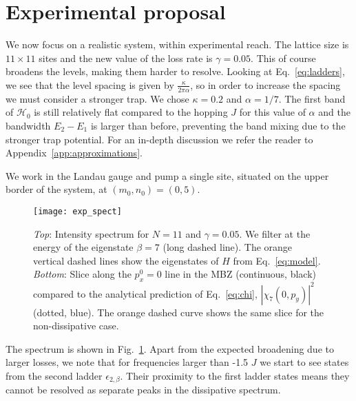 \documentclass[twocolumn, 10pt, aps, superscriptaddress, floatfix, showpacs, pra, citeautoscript]{revtex4-1}
\newcommand{\co}[2]{#2}
\renewcommand{\paragraph}{\co}
\begin{document}

\section{Experimental proposal}
\label{sec:experiment}

\paragraph{Greater dissipation implies spectral broadening.}
We now focus on a realistic system, within experimental reach. The
lattice size is $11 \times 11$ sites and the new value of the loss
rate is $\gamma = 0.05$. This of course broadens the levels, making
them harder to resolve. Looking at Eq.~\eqref{eq:ladders}, we see that
the level spacing is given by $\frac{\kappa}{2\pi\alpha}$, so in order
to increase the spacing we must consider a stronger trap. We chose
$\kappa = 0.2$ and $\alpha = 1/7$. The first band of $\mathcal{H}_0$
is still relatively flat compared to the hopping $J$ for this value of
$\alpha$ and the bandwidth $E_2 - E_1$ is larger than before,
preventing the band mixing due to the stronger trap potential. For an
in-depth discussion we refer the reader to
Appendix~\ref{app:approximations}.

 We work in the Landau gauge and pump a single site,
situated on the upper border of the system, at $(m_0,n_0)= (0,5)$.

\begin{figure}[htb]
  \centering
  \texttt{[image: exp\_spect]} %
  \caption{\emph{Top}: Intensity spectrum for $N=11$ and
    $\gamma = 0.05$. We filter at the energy of the eigenstate
    $\beta=7$ (long dashed line). The orange vertical dashed lines
    show the eigenstates of $H$ from Eq.~\eqref{eq:model}.
    \emph{Bottom}: Slice along the $p_x^0 = 0$ line in the MBZ
    (continuous, black) compared to the analytical prediction of
    Eq.~\eqref{eq:chi}, $|\chi_7(0,p_y)|^2$ (dotted, blue). The orange
    dashed curve shows the same slice for the non-dissipative case.}
  \label{fig:exp_spectrum}
\end{figure}


The spectrum is shown in Fig.~\ref{fig:exp_spectrum}. Apart from the
expected broadening due to larger losses, we note that for frequencies
larger than -1.5 $J$ we start to see states from the second ladder
$\epsilon_{2,\beta}$. Their proximity to the first ladder states means
they cannot be resolved as separate peaks in the dissipative spectrum.
\end{document}
